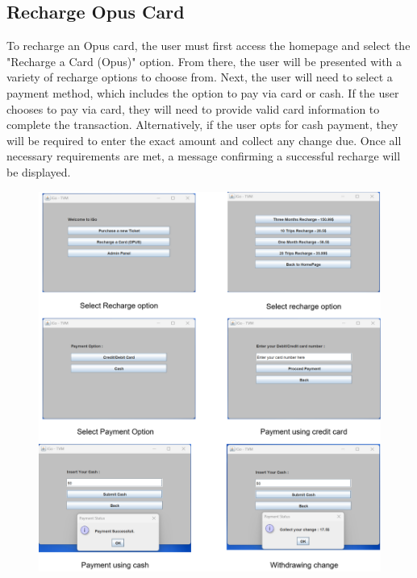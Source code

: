 \documentclass[a4paper, 11pt]{report}
\begin{document}
\subsection{Recharge Opus Card}
To recharge an Opus card, the user must first access the homepage and select the "Recharge a Card (Opus)" option. From there, the user will be presented with a variety of recharge options to choose from. Next, the user will need to select a payment method, which includes the option to pay via card or cash. If the user chooses to pay via card, they will need to provide valid card information to complete the transaction. Alternatively, if the user opts for cash payment, they will be required to enter the exact amount and collect any change due. Once all necessary requirements are met, a message confirming a successful recharge will be displayed.\\
\begin{figure}[h]
\centering
   \includegraphics[width=14cm]{3.png} 
\end{figure}
\clearpage
\end{document}
